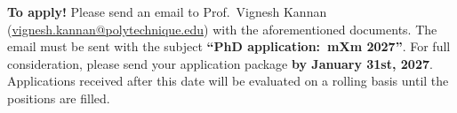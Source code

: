 \documentclass[a4paper,11pt,fleqn]{article}
\begin{document}
	\begin{myhlbox}{\textbf{To apply!}}
		Please {send an email} to {Prof.~Vignesh Kannan} (\href{mailto:vignesh.kannan@polytechnique.edu}{vignesh.kannan@polytechnique.edu}) with the aforementioned documents. The email must be sent with the subject \textbf{``PhD application:~mXm 2027''}. For full consideration, please send your application package \textbf{by January 31st, 2027}. Applications received after this date will be evaluated on a rolling basis until the positions are filled. 
	\end{myhlbox}
\end{document}
